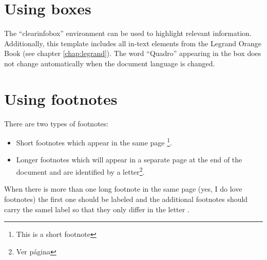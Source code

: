 \documentclass[11pt,fleqn]{book} %
\begin{document}
\pagebreak

\section{Using boxes}


The ``clearinfobox'' environment can be used to highlight relevant information.
Additionally, this template includes all in-text elements from the Legrand Orange Book
(see chapter \ref{chap:legrand}). The word ``Quadro'' appearing in the box does not change 
automatically when the document language is changed.

\begin{clearinfobox}[Box title]
\lipsum[1]
\end{clearinfobox}

\section{Using footnotes}


There are two types of footnotes:

\begin{itemize}
  \item Short footnotes which appear in the same page \footnote{This is a short footnote}.
  \item Longer footnotes which will appear in a separate page at the end of the document
  and are identified by a letter\footnote{\label{same_number} 
Ver página \pageref{notas}}.
\end{itemize}

When there is more than one long footnote in the same page (yes, I do love footnotes) the first
one should be labeled and the additional footnotes should carry the samel label so that they only differ 
in the letter .


\printbibliography[heading=subbibliography]

\iffalse
\begingroup
\let\enotesize\normalsize
\renewcommand\notesname{Notas finais}
\renewcommand\enoteformat{\noindent[\theenmark]\hspace{0.06in}}
\label{notas}
\theendnotes
\endgroup
\end{document}
